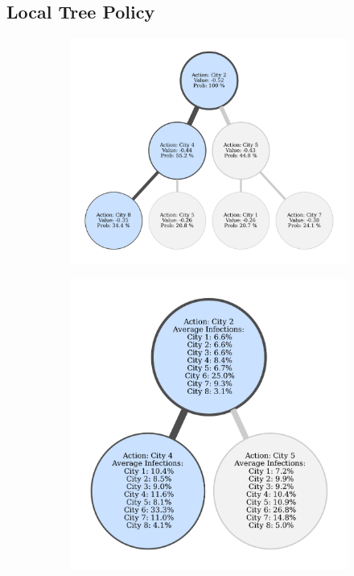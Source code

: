 \documentclass[letterpaper]{article} %
\begin{document}
\subsection{Local Tree Policy}
\begin{figure}[ht!]
    \centering
    \begin{subfigure}[t]{0.56\textwidth}
        \centering
        \includegraphics[width=\textwidth]{figs/vaccine_graph.pdf}
        \caption{}\label{fig: detail a}
    \end{subfigure}
        \begin{subfigure}[t]{0.43\textwidth}
        \centering
        \includegraphics[width=\textwidth]{figs/vaccine_detail_graph.pdf}

\end{subfigure}
\end{figure}
\end{document}

